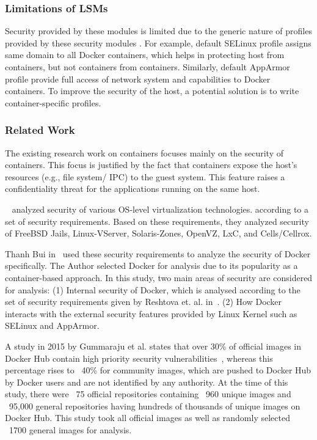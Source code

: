 \subsubsection{Limitations of LSMs}

Security provided by these modules is limited due to
the generic nature of profiles provided by these security
modules \cite{martin2018docker}. For example, default
SELinux profile assigns same domain to all Docker
containers, which helps in protecting host from containers,
but not containers from containers. Similarly, default
AppArmor profile provide full access of network system and
capabilities to Docker containers.
To improve the security of the host, a potential solution is to write
container-specific profiles.

\subsubsection{Related Work}

The existing research work on containers focuses mainly on the security of containers.
This focus is justified by the fact that containers expose the host's resources
(e.g., file system/ IPC) to the guest system. This feature raises a confidentiality
threat for the applications running on the same host. 

~\cite{reshetova2014security} analyzed security of various OS-level virtualization technologies.
according to a set of security requirements. Based on these requirements, they analyzed
security of FreeBSD Jails, Linux-VServer,
Solaris-Zones, OpenVZ, LxC, and Cells/Cellrox.

Thanh Bui in~\cite{bui2015analysis} used these security requirements to analyze the security of Docker specifically.
The Author selected Docker for analysis due to its popularity as a container-based approach.
In this study, two main areas of security are considered for analysis:
(1) Internal security of Docker, which is analysed according to the
set of security requirements given by Reshtova et. al. in~\cite{reshetova2014security}.
(2) How Docker interacts with the external security features provided
by Linux Kernel such as SELinux and AppArmor.

A study in 2015 by Gummaraju et al.
states that over 30\% of official images in Docker Hub contain high priority
security vulnerabilities~\cite{gummaraju2015over}, whereas this percentage rises 
to ~40\% for community images, which are pushed to Docker Hub by Docker users 
and are not identified by any authority.
At the time of this study, there were ~75 official repositories containing 
~960 unique images and ~95,000 general repositories having hundreds of thousands 
of unique images on Docker Hub.
This study took all official images as well as randomly selected ~1700 general images for analysis.

